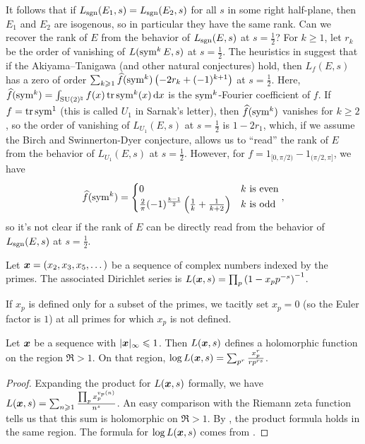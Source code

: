 It follows that if $L_{\operatorname{sgn}}(E_1,s) = L_{\operatorname{sgn}}(E_2,s)$ for all $s$ in some 
right half-plane, then $E_1$ and $E_2$ 
are isogenous, so in particular they have the same rank. Can we recover the 
rank of $E$ from the behavior of $L_{\operatorname{sgn}}(E,s)$ at $s = \frac 1 2$? For 
$k\geqslant 1$, let $r_k$ be the order of vanishing of $L(\operatorname{sym}^k E,s)$ at 
$s = \frac 1 2$. The heuristics in \cite{sarnak-2007} suggest that if the 
Akiyama--Tanigawa (and other natural conjectures) hold, then $L_f(E,s)$ has a 
zero of order 
$\sum_{k\geqslant 1} \widehat f(\operatorname{sym}^k) \left(-2 r_k + (-1)^{k+1}\right)$ at 
$s = \frac 1 2$. Here, 
$\widehat f(\operatorname{sym}^k) = \int_{\operatorname{SU}(2)^\natural} f(x) \operatorname{tr}\operatorname{sym}^k(x)\, \mathrm{d} x$ is the 
$\operatorname{sym}^k$-Fourier coefficient of $f$. If $f = \operatorname{tr}\operatorname{sym}^1$ (this is called $U_1$ 
in Sarnak's letter), then $\widehat f(\operatorname{sym}^k)$ vanishes for $k\geqslant 2$, so 
the order of vanishing of $L_{U_1}(E,s)$ at $s = \frac 1 2$ is $1 - 2 r_1$, 
which, if we assume the Birch and Swinnerton-Dyer conjecture, allows us to 
``read'' the rank of $E$ from the behavior of $L_{U_1}(E,s)$ at 
$s = \frac 1 2$. However, for $f = 1_{[0,\pi/2)} - 1_{(\pi/2,\pi]}$, we have 
\[
	\widehat f(\operatorname{sym}^k) = 
	\begin{cases}
		0 & \text{$k$ is even} \\
		\frac 2 \pi (-1)^{\frac{k-1}{2}} \left(\frac 1 k + \frac{1}{k+2}\right) & \text{$k$ is odd} 
	\end{cases} ,
\]
so it's not clear if the rank of $E$ can be directly read from the behavior 
of $L_{\operatorname{sgn}}(E,s)$ at $s = \frac 1 2$. 

\begin{definition}
Let ${\boldsymbol x}=(x_2,x_3,x_5,\dots)$ be a sequence of complex numbers indexed by the 
primes. The associated Dirichlet series is 
$L({\boldsymbol x},s) = \prod_p \left(1- x_p p^{-s}\right)^{-1}$. 
\end{definition}

If $x_p$ is defined only for a subset of the primes, we tacitly set $x_p = 0$ 
(so the Euler factor is $1$) at all primes for which $x_p$ is not defined. 

\begin{lemma}
Let ${\boldsymbol x}$ be a sequence with $|{\boldsymbol x}|_\infty \leqslant 1$. Then $L({\boldsymbol x},s)$ 
defines a holomorphic function on the region $\Re > 1$. On that region, 
$\log L({\boldsymbol x},s) = \sum_{p^r} \frac{x_p^r}{r p^{r s}}$. 
\end{lemma}
\begin{proof}
Expanding the product for $L({\boldsymbol x},s)$ formally, we have 
$L({\boldsymbol x},s) = \sum_{n\geqslant 1} \frac{\prod_p x_p^{v_p(n)}}{n^s}$. 
An easy comparison with the Riemann zeta function tells us that this sum 
is holomorphic on $\Re > 1$. By \cite[Th.~11.7]{apostol-1976}, the 
product formula holds in the same region. The formula for $\log L({\boldsymbol x},s)$ 
comes from \cite[11.9 Ex.~2]{apostol-1976}. 
\end{proof}

